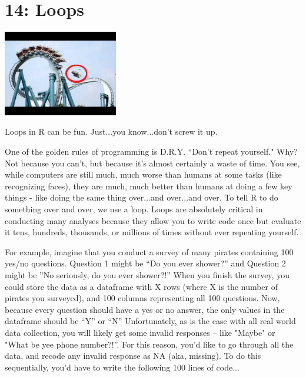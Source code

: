 \documentclass{tufte-book}\usepackage[]{graphicx}\usepackage[]{color}
\begin{document}

\chapter{14: Loops}
\label{ch:14}


\begin{marginfigure}
\includegraphics[width=5cm,keepaspectration]{coasteraccident.jpg}
\caption{Loops in R can be fun. Just...you know...don't screw it up.}
\end{marginfigure}


One of the golden rules of programming is D.R.Y. ``Don't repeat yourself." Why? Not because you can't, but because it's almost certainly a waste of time. You see, while computers are still much, much worse than humans at some tasks (like recognizing faces), they are much, much better than humans at doing a few key things - like doing the same thing over...and over...and over. To tell R to do something over and over, we use a loop. Loops are absolutely critical in conducting many analyses because they allow you to write code once but evaluate it tens, hundreds, thousands, or millions of times without ever repeating yourself.

For example, imagine that you conduct a survey of many pirates containing 100 yes/no questions. Question 1 might be ``Do you ever shower?'' and Question 2 might be ''No seriously, do you ever shower?!'' When you finish the survey, you could store the data as a dataframe with X rows (where X is the number of pirates you surveyed), and 100 columns representing all 100 questions. Now, because every question should have a yes or no answer, the only values in the dataframe should be ``Y'' or ``N'' Unfortunately, as is the case with all real world data collection, you will likely get some invalid responses -- like "Maybe" or "What be yee phone number?!''. For this reason, you'd like to go through all the data, and recode any invalid response as NA (aka, missing). To do this sequentially, you'd have to write the following 100 lines of code...
\end{document}
